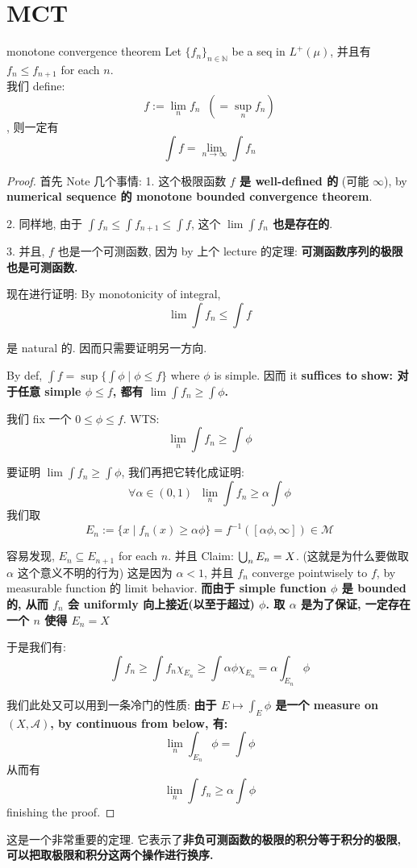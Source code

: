 \documentclass[lang=cn,11pt]{elegantbook}
\begin{document}
\section{MCT}
\begin{theorem}{monotone convergence theorem}
\label{MCT}
Let $\{f_n\}_{n\in\mathbb{N}}$ be a seq in $L^+(\mu)$, 并且有 $f_n \leq f_{n+1}$ for each $n$. \\
我们 define:$$f := \lim_n f_n \; \; (= \sup_n f_n)$$, 则一定有 $$\int f = \lim_{n\rightarrow \infty } \int f_n$$
 \end{theorem}
\begin{proof}
首先 Note 几个事情: 
1. 这个极限函数 \textbf{$f$ 是 well-defined 的} (可能 $\infty$), by \textbf{numerical sequence 的 monotone bounded convergence theorem}. 

2. 同样地, 由于 $\int f_n \leq \int f_{n+1} \leq \int f$, 这个 \textbf{$\lim \int f_n$ 也是存在的}.

3. 并且, $f$ 也是一个可测函数, 因为 by 上个 lecture 的定理: \textbf{可测函数序列的极限也是可测函数.}

现在进行证明: 
By monotonicity of integral, $$\lim \int f_n \leq \int f$$ 

是 natural 的. 因而只需要证明另一方向.

By def, $\int f = \sup \{ \int \phi \mid \phi \leq f\}$ where $\phi $ is simple.
因而 it \textbf{suffices to show: 对于任意 simple $\phi \leq f$, 都有 $\lim \int f_n \geq \int \phi$.}

我们 fix 一个 $0 \leq \phi \leq f$. WTS: $$\lim_n \int f_n \geq \int \phi$$

要证明 $\lim \int f_n \geq \int \phi$, 我们再把它转化成证明: $$\forall \alpha \in (0,1)\;\;\lim_n \int f_n \geq \alpha \int \phi$$
我们取 $$ E_n := \{x \mid f_n(x) \geq \alpha \phi  \} = f^{-1} ([\alpha \phi,\infty]) \in \mathcal{M}$$

容易发现, $E_n \subseteq E_{n+1}$ for each $n$. 并且 Claim: $\bigcup_n E_n = X$.  (这就是为什么要做取 $\alpha$ 这个意义不明的行为) 这是因为 $\alpha < 1$, 并且 $f_n$ converge pointwisely to $f$, by measurable function 的 limit behavior.  \textbf{而由于 simple function $\phi$ 是 bounded 的, 从而 $f_n$ 会 uniformly 向上接近(以至于超过) $\phi$. 取 $\alpha$ 是为了保证, 一定存在一个 $n$ 使得 $E_n = X$ }

于是我们有:
$$
\int f_n \geq \int f_n \chi_{E_n}  \geq \int \alpha \phi \chi_{E_n} = \alpha \int_{E_n} \phi
$$

我们此处又可以用到一条冷门的性质: \textbf{由于 $E \mapsto \int_E \phi$ 是一个 measure on $(X,\mathcal{A})$, by continuous from below, 有:}
$$
\lim_n \int_{E_n} \phi  = \int \phi
$$
从而有$$\lim_n \int f_n \geq \alpha \int \phi$$ finishing the proof.
\end{proof}
\begin{remark}
    这是一个非常重要的定理. 它表示了\textbf{非负可测函数的极限的积分等于积分的极限, 可以把取极限和积分这两个操作进行换序.}
\end{remark}
\end{document}
